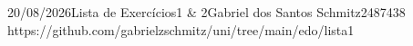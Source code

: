 \documentclass{article}
\begin{document}
{20/08/2026}{Lista de Exercícios}{1 \& 2}{Gabriel dos Santos Schmitz}{2487438}
{https://github.com/gabrielzschmitz/uni/tree/main/edo/lista1}





\newpage
\printbibliography\
\end{document}
